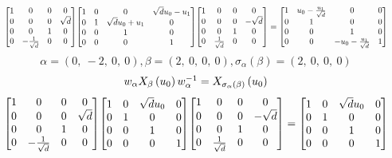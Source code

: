 \documentclass[11pt]{article}
\theoremstyle{definition}
\begin{document}
\[
\scaletoalign{\textwidth}{{\left[\begin{matrix}1 & 0 & 0 & 0\\0 & 0 & 0 & \sqrt{d}\\0 & 0 & 1 & 0\\0 & - \frac{1}{\sqrt{d}} & 0 & 0\end{matrix}\right]} {\left[\begin{matrix}1 & 0 & 0 & \sqrt{d} u_{0} - u_{1}\\0 & 1 & \sqrt{d} u_{0} + u_{1} & 0\\0 & 0 & 1 & 0\\0 & 0 & 0 & 1\end{matrix}\right]} {\left[\begin{matrix}1 & 0 & 0 & 0\\0 & 0 & 0 & - \sqrt{d}\\0 & 0 & 1 & 0\\0 & \frac{1}{\sqrt{d}} & 0 & 0\end{matrix}\right]} = {\left[\begin{matrix}1 & u_{0} - \frac{u_{1}}{\sqrt{d}} & 0 & 0\\0 & 1 & 0 & 0\\0 & 0 & 1 & 0\\0 & 0 & - u_{0} - \frac{u_{1}}{\sqrt{d}} & 1\end{matrix}\right]}}
\]
\[
\alpha = \left( 0, \  -2, \  0, \  0\right), \beta = \left( 2, \  0, \  0, \  0\right), \sigma_{\alpha}(\beta) = \left( 2, \  0, \  0, \  0\right)
\]
\[
\scaletoalign{\textwidth}{w_{\alpha} X_{\beta}\left(u_{0}\right) w_{\alpha}^{-1} = X_{\sigma_{\alpha}\left(\beta\right)}\left(u_{0}\right)}
\]
\[
\scaletoalign{\textwidth}{{\left[\begin{matrix}1 & 0 & 0 & 0\\0 & 0 & 0 & \sqrt{d}\\0 & 0 & 1 & 0\\0 & - \frac{1}{\sqrt{d}} & 0 & 0\end{matrix}\right]} {\left[\begin{matrix}1 & 0 & \sqrt{d} u_{0} & 0\\0 & 1 & 0 & 0\\0 & 0 & 1 & 0\\0 & 0 & 0 & 1\end{matrix}\right]} {\left[\begin{matrix}1 & 0 & 0 & 0\\0 & 0 & 0 & - \sqrt{d}\\0 & 0 & 1 & 0\\0 & \frac{1}{\sqrt{d}} & 0 & 0\end{matrix}\right]} = {\left[\begin{matrix}1 & 0 & \sqrt{d} u_{0} & 0\\0 & 1 & 0 & 0\\0 & 0 & 1 & 0\\0 & 0 & 0 & 1\end{matrix}\right]}}
\]
\end{document}
